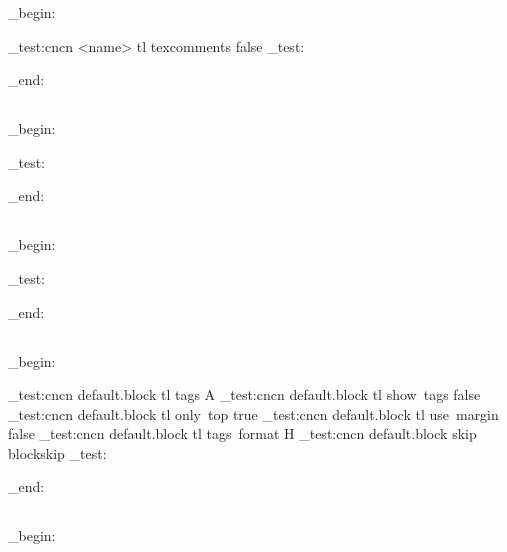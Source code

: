 \ExplSyntaxOn
\group_begin:
\ExplSyntaxOff



\ExplSyntaxOn
\CDR_test:cncn { <name> } { tl } { texcomments } { false }
\CDR_test:

\group_end:
\ExplSyntaxOff

\subsection{}
\ExplSyntaxOn
\group_begin:

\CDRSet{
}

\CDR_test:

\group_end:
\ExplSyntaxOff

\subsection{}
\ExplSyntaxOn
\group_begin:

\CDRSet{
}

\CDR_test:

\group_end:
\ExplSyntaxOff

\subsection{}
\ExplSyntaxOn
\group_begin:


\CDR_test:cncn { default.block } { tl } { tags } { A }
\CDR_test:cncn { default.block } { tl } { show~tags } { false }
\CDR_test:cncn { default.block } { tl } { only~top } { true }
\CDR_test:cncn { default.block } { tl } { use~margin } { false }
\CDR_test:cncn { default.block } { tl } { tags~format } { H }
\CDR_test:cncn { default.block } { skip } { blockskip } { \topsep }
\CDR_test:

\group_end:
\ExplSyntaxOff

\subsection{}

\ExplSyntaxOn
\group_begin:



